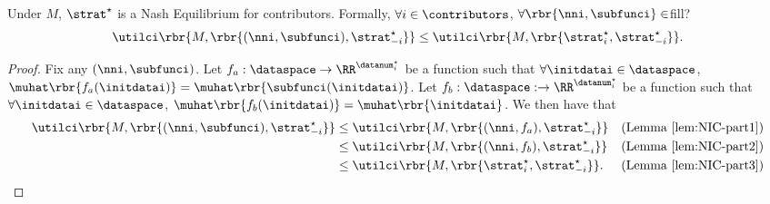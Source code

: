 \begin{lemma}
    \label{lem:main_prop1}
    Under $M$, $\strat^\star$ is a Nash Equilibrium for contributors. Formally, $\forall i\in\contributors$, 
    $\forall\rbr{\nni,\subfunci}\in$\ac{fill?}
    \begin{equation*}
        \utilci\rbr{
            M, \rbr{
                (\nni,\subfunci),
                \strat_{-i}^{\star}
            }
        }
        \leq
        \utilci\rbr{
            M, \rbr{
                \strat_i^\star,
                \strat_{-i}^{\star}
            }
        } . 
    \end{equation*}
\end{lemma}
\begin{proof}
    Fix any $(\nni,\subfunci)$. Let $f_a:\dataspace\rightarrow\RR^{\datanum_i^{\star}}$ be a function such that $\forall \initdatai\in\dataspace$, $\muhat\rbr{f_a(\initdatai)}=\muhat\rbr{\subfunci(\initdatai)}$. Let $f_b:\dataspace:\rightarrow\RR^{\datanum_i^{\star}}$ be a function such that $\forall \initdatai\in\dataspace$, $\muhat\rbr{f_b(\initdatai)}=\muhat\rbr{\initdatai}$.
    We then have that
    \begin{align*}
        \utilci \rbr{M, \rbr{(\nni,\subfunci),\strat_{-i}^{\star} }}
        &\leq
        \utilci \rbr{M, \rbr{(\nni,f_a),\strat_{-i}^{\star} }}
        &
        (\text{Lemma}~\ref{lem:NIC-part1})
        \\
        &\leq
        \utilci \rbr{M, \rbr{(\nni,f_b),\strat_{-i}^{\star} }}
        &
        (\text{Lemma}~\ref{lem:NIC-part2})
        \\
        &\leq
        \utilci \rbr{M, \rbr{\strat_{i}^{\star},\strat_{-i}^{\star} }} .
        &
        \hspace{-1cm}
        (\text{Lemma}~\ref{lem:NIC-part3})
    \end{align*}
\end{proof}

